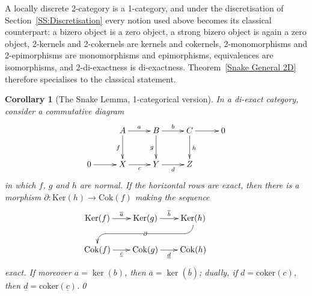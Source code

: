 \documentclass[reqno,a4paper]{amsart}
\numberwithin{equation}{section}
\theoremstyle{plain}
\newtheorem{corollary}[subsection]{Corollary}
\theoremstyle{definition}
\newcommand{\noproof}{\hfill \qed}
\def\nameit#1{\textrm{#1}~}
\def\thex{\nameit{Theorem}}
\newcommand{\ov}[1]{\overline{#1}}
\renewcommand{\1}{\onecat{1}}
\newcommand{\Ker}{\ensuremath{\mathrm{Ker}}}
\newcommand{\Coker}{\ensuremath{\mathrm{Cok}}}
\newcommand{\coker}{\ensuremath{\mathrm{coker}}}
\begin{document}
A locally discrete 2-category is a 1-category, and under the discretisation of Section~\ref{SS:Discretisation} every notion used above becomes its classical counterpart: a bizero object is a zero object, a strong bizero object is again a zero object, 2-kernels and 2-cokernels are kernels and cokernels, 2-monomorphisms and 2-epimorphisms are monomorphisms and epimorphisms, equivalences are isomorphisms, and 2-di-exactness is di-exactness. \thex\ref{Snake General 2D} therefore specialises to the classical statement.

\begin{corollary}[The Snake Lemma, 1-categorical version]\label{Snake General}
	In a di-exact category, consider a commutative diagram
	\begin{equation*}
		\xymatrix@!0@=4em{
		& A \ar[d]_{f} \ar[r]^-{a} &
		B \ar[d]_{g} \ar[r]^-{b} &
		C \ar[d]^{h} \ar[r] &
		0 \\
		0 \ar[r] &
		X \ar[r]_-{c} &
		Y \ar[r]_-{d} &
		Z}
	\end{equation*}
	in which \(f\), \(g\) and \(h\) are normal. If the horizontal rows are exact, then there is a morphism \(\partial\colon\Ker(h)\to\Coker(f)\) making the sequence
	\begin{equation*}
		\xymatrix@R=5ex@C=2em{
		\Ker({f}) \ar[r]^-{\ov{a}} &
		\Ker({g}) \ar[r]^-{\ov{b}} &
		\Ker({h}) \ar `d[l] `[dll]|-{\partial} [dll] &\\
		\Coker({f}) \ar[r]_-{\underline{c}} &
		\Coker({g}) \ar[r]_-{\underline{d}} &
		\Coker({h})
		}
	\end{equation*}
	exact. If moreover \(a=\ker(b)\), then \(\ov{a}=\ker(\ov{b})\); dually, if \(d=\coker(c)\), then \(\underline{d}=\coker(\underline{c})\).\noproof
\end{corollary}
\end{document}
